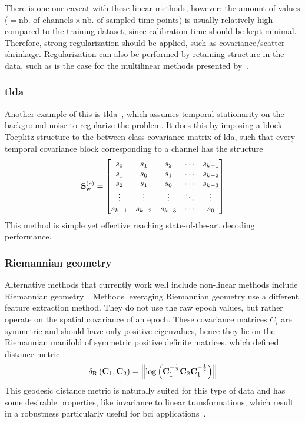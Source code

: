 There is one one caveat with these linear methods, however:
the amount of values ($=\text{nb. of channels}\times\text{nb. of sampled time points}$)
is usually relatively high compared to the training dataset, since calibration
time should be kept minimal.
Therefore, strong regularization should be applied, such as covariance/scatter
shrinkage.
Regularization can also be performed by retaining structure in the data, such
as is the case for the multilinear methods presented by~\textcite{Lotte2018}.

\subsubsection{\Acf{tlda}}

Another example of this is \ac{tlda}~\cite{Sosulski2022}, which assumes temporal
stationarity on the background noise to regularize the problem.
It does this by imposing a block-Toeplitz structure to the between-class covariance
matrix of \ac{lda}, such that every temporal covariance block corresponding to
a channel has the structure
\begin{equation}
  \mathbf{S}_\text{w}^{(c)} = \begin{bmatrix}
s_0 & s_1 & s_2 & \cdots & s_{k-1} \\
s_1 & s_0 & s_1 & \cdots & s_{k-2} \\
s_2 & s_1 & s_0 & \cdots & s_{k-3} \\
\vdots & \vdots & \vdots & \ddots & \vdots \\
s_{k-1} & s_{k-2} & s_{k-3} & \cdots & s_0
\end{bmatrix}
\end{equation}
This method is simple yet effective reaching state-of-the-art decoding
performance.


\subsubsection{Riemannian geometry}

Alternative methods that currently work well include
non-linear methods include Riemannian geometry~\cite{Barachant2014}.
Methods leveraging Riemannian geometry use a different feature extraction
method.
They do not use the raw epoch values, but rather operate on the spatial
covariance of an epoch.
These covariance matrices $C_i$ are symmetric and should have only positive
eigenvalues, hence they lie on the Riemannian manifold of symmetric positive
definite matrices, which defined distance metric
\begin{equation}
  \delta_\text{R}\left(\mathbf{C}_1,\mathbf{C}_2\right)
  =\left\lVert\log\left(\mathbf{C}_1^{-\frac{1}{2}} \mathbf{C}_2 \mathbf{C}_1^{-\frac{1}{2}}\right)\right\rVert
\end{equation}
This geodesic distance metric is naturally suited for this type of data and has
some desirable properties, like invariance to linear transformations, which
result in a robustness particularly useful for \ac{bci}
applications~\cite{Barachant2011}.

